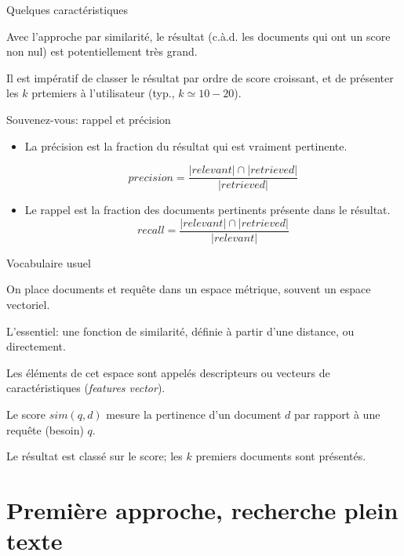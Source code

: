 \begin{frame}{Quelques caractéristiques}

Avec l'approche par similarité, le résultat (c.à.d. les documents qui ont un score non nul) 
est potentiellement \alert{très grand}.

\vfill

Il est impératif de \alert{classer} le résultat par ordre de score croissant, et
de présenter les $k$ prtemiers à l'utilisateur (typ., $k \simeq 10-20$).

\vfill

Souvenez-vous: rappel et précision 

\begin{itemize}
  \item La \alert{précision} est la fraction du résultat qui est vraiment pertinente.
  
  $$precision =\frac{|relevant| \cap |retrieved|}{|retrieved|}$$

\item Le \alert{rappel} est la fraction des documents pertinents présente dans le résultat.
$$recall =\frac{|relevant| \cap |retrieved|}{|relevant|}$$
\end{itemize}
\end{frame}




\begin{frame}{Vocabulaire usuel}

On place \alert{documents} et \alert{requête} dans un \alert{espace métrique}, souvent un \alert{espace vectoriel}.

\vfill

L'essentiel: une fonction de \alert{similarité}, définie à partir d'une distance, ou directement.

\vfill

Les éléments de cet espace sont appelés \alert{descripteurs} ou \alert{vecteurs de caractéristiques}
(\textit{features vector}).

\vfill

Le \alert{score} $sim(q,d)$ mesure la pertinence d'un document $d$ par rapport à une requête (besoin) $q$.

\vfill

Le résultat est \alert{classé} sur le score; les $k$ premiers documents sont présentés.

\end{frame}

\section{Première approche, recherche plein texte}



